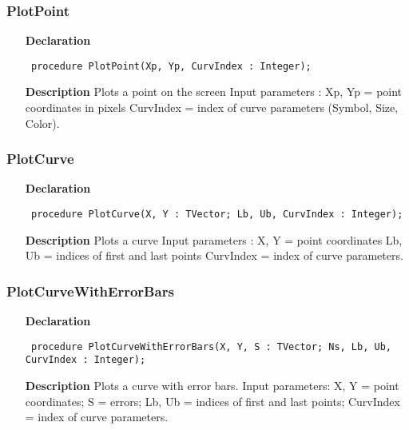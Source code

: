 \documentclass[12pt,a4paper,oneside]{report}
\newcommand{\declarationitem}[1]{\textbf{#1}}
\newcommand{\descriptiontitle}[1]{\textbf{#1}}
\newcommand{\code}[1]{\texttt{#1}}
\begin{document}
\subsubsection{PlotPoint}
\label{uplot-PlotPoint}
\begin{itemize}\item[\declarationitem{Declaration}\hfill]
	\begin{flushleft}
		\code{
			procedure PlotPoint(Xp, Yp, CurvIndex : Integer);}
		
	\end{flushleft}
	
	\par
	\item[\descriptiontitle{Description}]
	Plots a point on the screen Input parameters : Xp, Yp = point coordinates in pixels CurvIndex = index of curve parameters (Symbol, Size, Color).
	
\end{itemize}
\subsubsection{PlotCurve}
\label{uplot-PlotCurve}
\begin{itemize}\item[\declarationitem{Declaration}\hfill]
	\begin{flushleft}
		\code{
			procedure PlotCurve(X, Y : TVector; Lb, Ub, CurvIndex : Integer);}
		
	\end{flushleft}
	
	\par
	\item[\descriptiontitle{Description}]
	Plots a curve Input parameters : X, Y = point coordinates Lb, Ub = indices of first and last points CurvIndex = index of curve parameters.
	
\end{itemize}
\subsubsection{PlotCurveWithErrorBars}
\label{uplot-PlotCurveWithErrorBars}
\begin{itemize}\item[\declarationitem{Declaration}\hfill]
	\begin{flushleft}
		\code{
			procedure PlotCurveWithErrorBars(X, Y, S : TVector; Ns, Lb, Ub, CurvIndex : Integer);}
		
	\end{flushleft}
	
	\par
	\item[\descriptiontitle{Description}]
	Plots a curve with error bars. Input parameters: X, Y = point coordinates; S = errors; Lb, Ub = indices of first and last points; CurvIndex = index of curve parameters.
	
\end{itemize}
\end{document}

